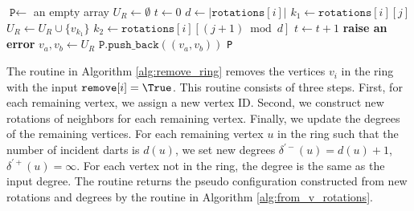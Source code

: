 \documentclass[main.tex]{subfiles}
\begin{document}
\begin{algorithm}[H]
    \caption{\findCutPairsWithLink($N, R, \texttt{rotations}$)}
    \label{alg:find_cut_pairs}
    \begin{algorithmic}[1]
        \State $\texttt{P} \gets$ an empty array
            \State $U_R \gets \emptyset$ 
            \State $t \gets 0$ 
            \State $d \gets |\texttt{rotations}[i]|$ 
                \State $k_1 \gets \texttt{rotations}[i][j]$
                    \State $U_R \gets U_R \cup \{v_{k_1}\}$
                \EndIf
                \State $k_2 \gets \texttt{rotations}[i][(j+1) \bmod d]$
                 
                    \State $t \gets t + 1$
                \EndIf
            \EndFor
                \State \textbf{raise an error} 
            \EndIf
             
                \State $v_a, v_b \gets U_R$
                \State $\texttt{P.push\_back}((v_a, v_b))$
            \EndIf
        \EndFor
        \State \Return \texttt{P}
    \end{algorithmic}
\end{algorithm}

The \removeRing routine in Algorithm \ref{alg:remove_ring} removes the vertices $v_i$ in the ring with the input $\texttt{remove}[i]=\True$.
This routine consists of three steps.
First, for each remaining vertex, we assign a new vertex ID.
Second, we construct new rotations of neighbors for each remaining vertex.
Finally, we update the degrees of the remaining vertices.
For each remaining vertex $u$ in the ring such that the number of incident darts is $d(u)$, we set new degrees $\delta^{\prime-}(u)=d(u)+1$, $\delta^{\prime+}(u)=\infty$.
For each vertex not in the ring, the degree is the same as the input degree.
The routine returns the pseudo configuration constructed from new rotations and degrees by the \fromVRotations routine in Algorithm \ref{alg:from_v_rotations}.
\end{document}
